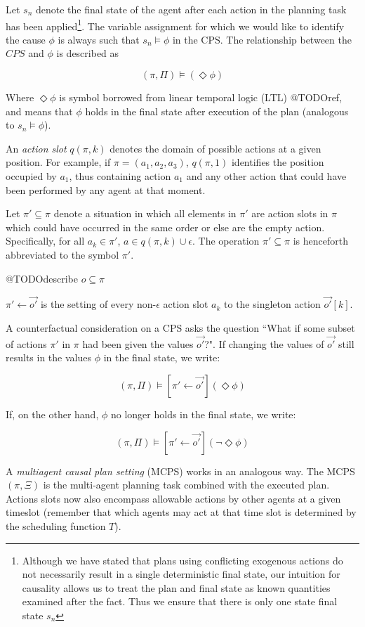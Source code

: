 \documentclass{article}
\theoremstyle{plain}
\theoremstyle{definition}
\begin{document}
Let $s_n$ denote the final state of the agent after each action in the planning task has been applied\footnote{Although we have stated that plans using conflicting exogenous actions do not necessarily result in a single deterministic final state, our intuition for causality allows us to treat the plan and final state as known quantities examined after the fact. Thus we ensure that there is only one state final state $s_n$}. The variable assignment for which we would like to identify the cause $\phi$ is always such that $s_n \models \phi$ in the CPS. The relationship between the $CPS$ and $\phi$ is described as

\[
(\pi, \Pi) \models (\Diamond \phi)
\]

Where $\Diamond \phi$ is symbol borrowed from linear temporal logic (LTL) @TODOref, and means that $\phi$ holds in the final state after execution of the plan (analogous to $s_n \models \phi$).

An \textit{action slot} $q(\pi,k)$ denotes the domain of possible actions at a given position. For example, if $\pi=(a_1,a_2,a_3)$, $q(\pi,1)$ identifies the position occupied by $a_1$, thus containing action $a_1$ and any other action that could have been performed by any agent at that moment.

Let $\pi'\subseteq \pi$ denote a situation in which all elements in $\pi'$ are action slots in $\pi$ which could have occurred in the same order or else are the empty action. Specifically, for all $a_k \in \pi'$, $a \in q(\pi,k) \cup \epsilon$. The operation $\pi'\subseteq \pi$ is henceforth abbreviated to the symbol $\pi'$.

@TODOdescribe $o \subseteq \pi$

$\pi' \leftarrow \vec{o'}$ is the setting of every non-$\epsilon$ action slot $a_k$ to the singleton action $\vec{o'}[k]$.


A counterfactual consideration on a CPS asks the question ``What if some subset of actions $\pi'$ in $\pi$ had been given the values $\vec{o'}$?". If changing the values of $\vec{o'}$ still results in the values $\phi$ in the final state, we write:

\[
(\pi, \Pi) \models [\pi' \leftarrow \vec{o'}](\Diamond \phi)
\]

If, on the other hand, $\phi$ no longer holds in the final state, we write:

\[
(\pi, \Pi) \models [\pi' \leftarrow \vec{o'}](\lnot \Diamond \phi)
\]


A \textit{multiagent causal plan setting} (MCPS) works in an analogous way. The MCPS $(\pi,\Xi)$ is the multi-agent planning task combined with the executed plan. Actions slots now also encompass allowable actions by other agents at a given timeslot (remember that which agents may act at that time slot is determined by the scheduling function $T$).
\end{document}
